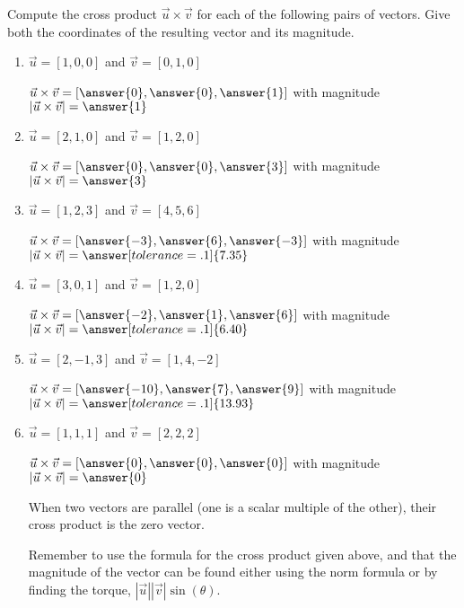 \documentclass{ximera}
\begin{document}
\begin{problem}
    Compute the cross product $\vec{u}\times\vec{v}$ for each of the following pairs of vectors. Give both the coordinates of the resulting vector and its magnitude.
    
    \begin{enumerate}
        \item $\vec{u}=[1,0,0]$ and $\vec{v}=[0,1,0]$
        
        $\vec{u}\times\vec{v}=[\answer{0},\answer{0},\answer{1}]$ with magnitude $|\vec{u}\times\vec{v}|=\answer{1}$
        
        \item $\vec{u}=[2,1,0]$ and $\vec{v}=[1,2,0]$
        
        $\vec{u}\times\vec{v}=[\answer{0},\answer{0},\answer{3}]$ with magnitude $|\vec{u}\times\vec{v}|=\answer{3}$
        
        \item $\vec{u}=[1,2,3]$ and $\vec{v}=[4,5,6]$
        
        $\vec{u}\times\vec{v}=[\answer{-3},\answer{6},\answer{-3}]$ with magnitude $|\vec{u}\times\vec{v}|=\answer[tolerance=.1]{7.35}$
        
        \item $\vec{u}=[3,0,1]$ and $\vec{v}=[1,2,0]$
        
        $\vec{u}\times\vec{v}=[\answer{-2},\answer{1},\answer{6}]$ with magnitude $|\vec{u}\times\vec{v}|=\answer[tolerance=.1]{6.40}$
        
        \item $\vec{u}=[2,-1,3]$ and $\vec{v}=[1,4,-2]$
        
        $\vec{u}\times\vec{v}=[\answer{-10},\answer{7},\answer{9}]$ with magnitude $|\vec{u}\times\vec{v}|=\answer[tolerance=.1]{13.93}$
        
        \item $\vec{u}=[1,1,1]$ and $\vec{v}=[2,2,2]$
        
        $\vec{u}\times\vec{v}=[\answer{0},\answer{0},\answer{0}]$ with magnitude $|\vec{u}\times\vec{v}|=\answer{0}$
        
        \begin{feedback}
            When two vectors are parallel (one is a scalar multiple of the other), their cross product is the zero vector.

            Remember to use the formula for the cross product given above, and that the magnitude of the vector can be found either using the norm formula or by finding the torque, $|\vec{u}||\vec{v}|\sin(\theta)$.
        \end{feedback}
    \end{enumerate}
\end{problem}
\end{document}
